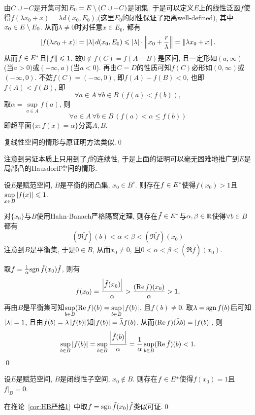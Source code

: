 	由$ C\cup -C $是开集可知$ E_0=E\setminus(C\cup-C) $是闭集. 于是可以定义$ E $上的线性泛函$ f $使得$ f(\lambda x_0+x)=\lambda d(x_0,E_0) $,(这里$ E_0 $的闭性保证了距离well-defined), 其中$ x_0\in E\setminus E_0 $. 从而$ \lambda\ne 0 $时对任意$ x\in E_0 $, 都有
	\[
	\left| f(\lambda x_0+x) \right| =\left| \lambda \right| d(x_0,E_0)\leqslant\left| \lambda \right| \cdot\left\| x_0+\frac{r}{\lambda} \right\|=\left\| \lambda x_0+x \right\|.
	\]
	从而$ f\in E^{*} $且$ \left\| f \right\|\leqslant 1 $. 故$ 0\notin f(C)=f(A-B) $是区间, 且一定形如$ (a,\infty) $(当$ a>0 $)或$ (-\infty,a) $(当$ a<0 $). 再由$ C=D $的性质可知$ f(C) $必形如$ (0,\infty) $或$ (-\infty,0) $. 不妨$ f(C)=(-\infty,0) $, 即$ f(A)-f(B)<0 $, 也即$ f(A)<f(B) $, 即
	\[
	\forall a\in A\,\forall b\in B\,(f(a)<f(b)),
	\]
	取$ \alpha=\sup\limits_{a\in A}f(a) $, 则
	\[
	\forall a\in A\,\forall b\in B\,(f(a)<\alpha\leqslant f(b))
	\]
	即超平面$ \{ x : f(x)=\alpha \} $分离$ A, B $.
	
	复线性空间的情形与原证明方法类似.\qed
	
	注意到另证本质上只用到了$ f $的连续性, 于是上面的证明可以毫无困难地推广到$ E $是局部凸的Hausdorff空间的情形.
	
	\begin{Corollary}\label{cor:HB严格1}
	设$ E $是赋范空间, $ B $是平衡的闭凸集, $ x_0\in B^c $. 则存在$ f\in E^{*} $使得$ f(x_0)>1 $且$ \sup\limits_{x\in B}\left| f(x) \right| \leqslant 1 $.
	\end{Corollary}
	\begin{Proof}
	对$ \{ x_0 \} $与$ B $使用Hahn-Banach严格隔离定理, 则存在$ \tilde{f}\in E^{*} $与$ \alpha,\beta\in\mathbb{R} $使得$ \forall b\in B $都有
	\[
	(\Re\tilde{f})(b)<\alpha<\beta<(\Re\tilde{f})(x_0)
	\]
	注意到$ B $是平衡集, 于是$ 0\in B $, 从而$ x_0\ne 0 $, 且$ 0<\alpha<\beta<(\Re\tilde{f})(x_0) $.
	
	取$ f=\frac{1}{\alpha}\mathrm{sgn}\,\tilde{f}(x_0)\tilde{f} $, 则有
	\[
	f(x_0)=\frac{\Big| \tilde f(x_0) \Big| }{\alpha}>\frac{(\mathrm{Re\,} \tilde{f})(x_0)}{\alpha}>1,
	\]
	再由$ B $是平衡集可知$ \sup\limits_{b\in B}(\mathrm{Re\,} f)(b)=\sup\limits_{b\in B}\left| f(b) \right|  $, 且$ f(b)\ne 0 $. 取$ \lambda=\mathrm{sgn}\, f(b) $后可知$ \left| \lambda \right| =1 $, 且由$ f(b)=\lambda\left| f(b) \right|  $知$ \left| f(b) \right| =\bar{\lambda}f(b) $. 从而$ (\mathrm{Re\,} f)(\bar{\lambda}b)=\left| f(b) \right|  $, 则
	\[
	\sup_{b\in B}\left| f(b) \right| =\sup_{b\in B}\frac{\Big| \tilde{f}(b) \Big| }{\alpha}=\frac{1}{\alpha}\sup_{b\in B}(\mathrm{Re\,}\tilde{f})(b)<1.
	\]
	\qed
	\end{Proof}
	
	\begin{Corollary}
	设$ E $是赋范空间, $ B $是闭线性子空间, $ x_0\notin B $. 则存在$ f\in E^{*} $使得$ f(x_0)=1 $且$ f\rvert_B=0 $.
	\end{Corollary}
	\begin{Proof}
	在推论~\ref{cor:HB严格1}~中取$ f=\mathrm{sgn}\,\tilde{f}(x_0)\tilde{f} $类似可证.\qed
	\end{Proof}
	
